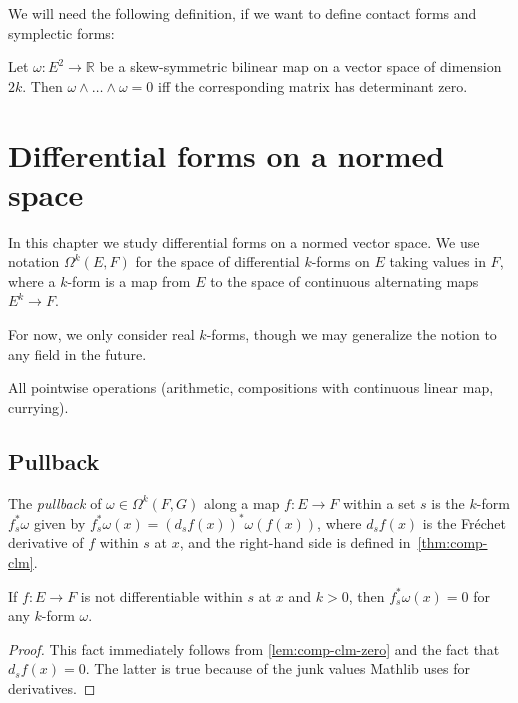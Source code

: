 We will need the following definition, if we want to define contact forms and symplectic forms:

\begin{theorem}
  Let \(\omega\colon E^{2}\to \mathbb R\) be a skew-symmetric bilinear map on a vector space of dimension \(2k\).
  Then \(\omega\wedge\dots\wedge\omega = 0\) iff the corresponding matrix has determinant zero.
\end{theorem}

\chapter{Differential forms on a normed space}%
\label{cha:differential-forms-normed-space}

In this chapter we study differential forms on a normed vector space.
We use notation \(\Omega^{k}(E, F)\) for the space of differential \(k\)-forms on \(E\) taking values in \(F\),
where a \(k\)-form is a map from \(E\) to the space of continuous alternating maps \(E^{k} \to F\).

For now, we only consider real \(k\)-forms, though we may generalize the notion to any field in the future.

All pointwise operations (arithmetic, compositions with continuous linear map, currying).

\section{Pullback}%
\label{sec:pullback}

\begin{definition}%
  \label{def:pullback-within}
  The \emph{pullback} of \(\omega\in \Omega^{k}(F, G)\) along a map \(f\colon E\to F\) within a set \(s\)
  is the \(k\)-form \(f_{s}^{*}\omega\) given by \(f_{s}^{*}\omega(x) = {(d_{s}f(x))}^{*}\omega(f(x))\),
  where \(d_{s}f(x)\) is the Fréchet derivative of \(f\) within \(s\) at \(x\),
  and the right-hand side is defined in~\autoref{thm:comp-clm}.
\end{definition}

\begin{lemma}%
  \label{lem:pullback-within-of-non-diff}
  If \(f\colon E\to F\) is not differentiable within \(s\) at \(x\) and \(k > 0\),
  then \(f_{s}^{*}\omega(x)=0\) for any \(k\)-form \(\omega\).
\end{lemma}
\begin{proof}
  This fact immediately follows from \autoref{lem:comp-clm-zero} and the fact that \(d_{s}f(x)=0\).
  The latter is true because of the junk values Mathlib uses for derivatives.
\end{proof}

